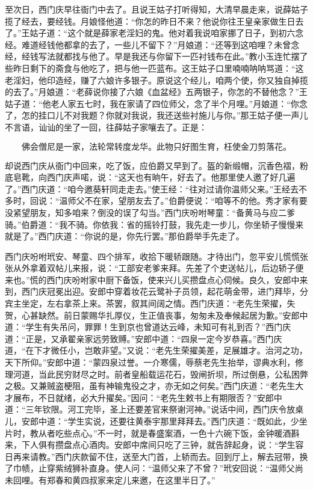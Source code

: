 至次日，西门庆早往衙门中去了。且说王姑子打听得知，大清早晨走来，说薛姑子揽了经去，要经钱。月娘怪他道：“你怎的昨日不来？他说你往王皇亲家做生日去了。”王姑子道：“这个就是薛家老淫妇的鬼。他对着我说咱家挪了日子，到初六念经。难道经钱他都拿的去了，一些儿不留下？”月娘道：“还等到这咱哩？未曾念经，经钱写法就都找与他了。早是我还与你留下一匹衬钱布在此。”教小玉连忙摆了些昨日剩下的斋食与他吃了，把与他一匹蓝布。这王姑子口里喃喃呐呐骂道：“这老淫妇，他印造经，赚了六娘许多银子。原说这个经儿，咱两个使，你又独自掉揽的去了。”月娘道：“老薛说你接了六娘《血盆经》五两银子，你怎的不替他念？”王姑子道：“他老人家五七时，我在家请了四位师父，念了半个月哩。”月娘道：“你念了，怎的挂口儿不对我题？你就对我说，我还送些衬施儿与你。”那王姑子便一声儿不言语，讪讪的坐了一回，往薛姑子家嚷去了。正是：

\[
佛会僧尼是一家，法轮常转度龙华。
此物只好图生育，枉使金刀剪落花。
\]

却说西门庆从衙门中回来，吃了饭，应伯爵又早到了。盔的新缎帽，沉香色\textYiXuan 褶，粉底皂靴，向西门庆声喏，说：“这天也有晌午，好去了。他那里使人邀了好几遍了。”西门庆道：“咱今邀葵轩同走走去。”使王经：“往对过请你温师父来。”王经去不多时，回说：“温师父不在家，望朋友去了。”伯爵便说：“咱等不的他。秀才家有要没紧望朋友，知多咱来？倒没的误了勾当。”西门庆吩咐琴童：“备黄马与应二爹骑。”伯爵道：“我不骑。你依我：省的摇铃打鼓，我先走一步儿，你坐轿子慢慢来就是了。”西门庆道：“你说的是，你先行罢。”那伯爵举手先走了。

西门庆吩咐玳安、琴童、四个排军，收拾下暖轿跟随。才待出门，忽平安儿慌慌张张从外拿着双帖儿来报，说：“工部安老爹来拜。先差了个吏送帖儿，后边轿子便来也。”慌的西门庆吩咐家中厨下备饭，使来兴儿买攒盘点心伺候。良久，安郎中来到，西门庆冠冕出迎。安郎中穿着妆花云鹭补子员领，起花萌金带，进门拜毕，分宾主坐定，左右拿茶上来。茶罢，叙其间阔之情。西门庆道：“老先生荣擢，失贺，心甚缺然。前日蒙赐华扎厚仪，生正值丧事，匆匆未及奉候起居为歉。”安郎中道：“学生有失吊问，罪罪！生到京也曾道达云峰，未知可有礼到否？”西门庆道：“正是，又承翟亲家远劳致赙。”安郎中道：“四泉一定今岁恭喜。”西门庆道，“在下才微任小，岂敢非望。”又说：“老先生荣擢美差，足展雄才。治河之功，天下所仰。”安郎中道：“蒙四泉过誉。一介寒儒，辱蔡老先生抬举，谬典水利，修理河道，当此民穷财尽之时。前者皇船载运花石，毁闸折坝，所过倒悬，公私困弊之极。又兼贼盗梗阻，虽有神输鬼役之才，亦无如之何矣。”西门庆道：“老先生大才展布，不日就绪，必大升擢矣。”因问：“老先生敕书上有期限否？”安郎中道：“三年钦限。河工完毕，圣上还要差官来祭谢河神。”说话中间，西门庆令放桌儿，安郎中道：“学生实说，还要往黄泰宇那里拜拜去。”西门庆道：“既如此，少坐片时，教从者吃些点心。”不一时，就是春盛案酒，一色十六碗下饭，金钟暖酒斟来，下人俱有攒盘点心酒肉。安郎中席间只吃了三钟，就告辞起身，说：“学生容日再来请教。”西门庆款留不住，送至大门首，上轿而去。回到厅上，解去冠带，换了巾帻，止穿紫绒狮补直身。使人问：“温师父来了不曾？”玳安回说：“温师父尚未回哩。有郑春和黄四叔家来定儿来邀，在这里半日了。”

